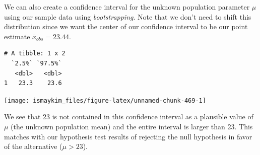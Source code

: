 \documentclass[12pt,]{krantz}
\makeatletter
\newenvironment{Shaded}{\begin{snugshade}}{\end{snugshade}}
\newcommand{\KeywordTok}[1]{\textcolor[rgb]{0.27,0.27,0.27}{\textbf{#1}}}
\newcommand{\DataTypeTok}[1]{\textcolor[rgb]{0.27,0.27,0.27}{#1}}
\newcommand{\DecValTok}[1]{\textcolor[rgb]{0.06,0.06,0.06}{#1}}
\newcommand{\StringTok}[1]{\textcolor[rgb]{0.5,0.5,0.5}{#1}}
\newcommand{\OperatorTok}[1]{\textcolor[rgb]{0.43,0.43,0.43}{\textbf{#1}}}
\newcommand{\NormalTok}[1]{#1}
\newenvironment{kframe}{%
\medskip{}
\setlength{\fboxsep}{.8em}
 \def\at@end@of@kframe{}%
 \ifinner\ifhmode%
  \def\at@end@of@kframe{\end{minipage}}%
  \begin{minipage}{\columnwidth}%
 \fi\fi%
 \def\FrameCommand##1{\hskip\@totalleftmargin \hskip-\fboxsep
 \colorbox{shadecolor}{##1}\hskip-\fboxsep
     \hskip-\linewidth \hskip-\@totalleftmargin \hskip\columnwidth}%
 \MakeFramed {\advance\hsize-\width
   \@totalleftmargin\z@ \linewidth\hsize
   \@setminipage}}%
 {\par\unskip\endMakeFramed%
 \at@end@of@kframe}
\renewenvironment{Shaded}{\begin{kframe}}{\end{kframe}}
\theoremstyle{definition}
\theoremstyle{definition}
\theoremstyle{definition}
\theoremstyle{remark}
\makeatother
\begin{document}
We can also create a confidence interval for the unknown population
parameter \(\mu\) using our sample data using \emph{bootstrapping}. Note
that we don't need to shift this distribution since we want the center
of our confidence interval to be our point estimate
\(\bar{x}_{obs} = 23.44\).

\begin{Shaded}
\end{Shaded}

\begin{Shaded}
\end{Shaded}

\begin{verbatim}
# A tibble: 1 x 2
  `2.5%` `97.5%`
   <dbl>   <dbl>
1   23.3    23.6
\end{verbatim}

\begin{Shaded}
\end{Shaded}

\begin{center}\texttt{[image: ismaykim\_files/figure-latex/unnamed-chunk-469-1]} \end{center}

We see that 23 is not contained in this confidence interval as a
plausible value of \(\mu\) (the unknown population mean) and the entire
interval is larger than 23. This matches with our hypothesis test
results of rejecting the null hypothesis in favor of the alternative
(\(\mu > 23\)).
\end{document}
